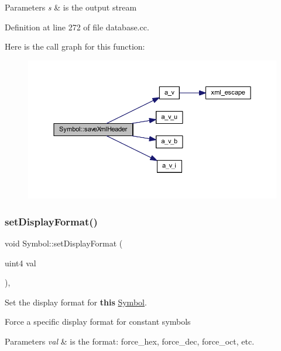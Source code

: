 \begin{DoxyParams}{Parameters}
{\em s} & is the output stream \\
\hline
\end{DoxyParams}


Definition at line 272 of file database.\+cc.

Here is the call graph for this function\+:
\nopagebreak
\begin{figure}[H]
\begin{center}
\leavevmode
\includegraphics[width=350pt]{class_symbol_a3aad352e6eb26be6cff727b66e86a9d4_cgraph}
\end{center}
\end{figure}
\mbox{\label{class_symbol_a13e0266010d85bcff19e91ee7404418b}} 
\subsubsection{\texorpdfstring{setDisplayFormat()}{setDisplayFormat()}}
{\footnotesize\ttfamily void Symbol\+::set\+Display\+Format (\begin{DoxyParamCaption}\item[{uint4}]{val }\end{DoxyParamCaption})\hspace{0.3cm}{\ttfamily [inline]}, {\ttfamily [protected]}}



Set the display format for {\bfseries{this}} \mbox{\hyperlink{class_symbol}{Symbol}}. 

Force a specific display format for constant symbols 
\begin{DoxyParams}{Parameters}
{\em val} & is the format\+: force\+\_\+hex, force\+\_\+dec, force\+\_\+oct, etc. \\
\hline
\end{DoxyParams}


